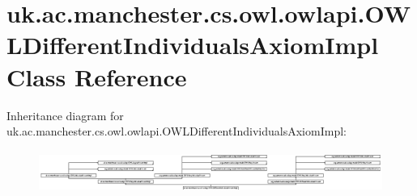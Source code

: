 \hypertarget{classuk_1_1ac_1_1manchester_1_1cs_1_1owl_1_1owlapi_1_1_o_w_l_different_individuals_axiom_impl}{\section{uk.\-ac.\-manchester.\-cs.\-owl.\-owlapi.\-O\-W\-L\-Different\-Individuals\-Axiom\-Impl Class Reference}
\label{classuk_1_1ac_1_1manchester_1_1cs_1_1owl_1_1owlapi_1_1_o_w_l_different_individuals_axiom_impl}
}
Inheritance diagram for uk.\-ac.\-manchester.\-cs.\-owl.\-owlapi.\-O\-W\-L\-Different\-Individuals\-Axiom\-Impl\-:\begin{figure}[H]
\begin{center}
\leavevmode
\includegraphics[height=1.410579cm]{classuk_1_1ac_1_1manchester_1_1cs_1_1owl_1_1owlapi_1_1_o_w_l_different_individuals_axiom_impl}
\end{center}
\end{figure}
